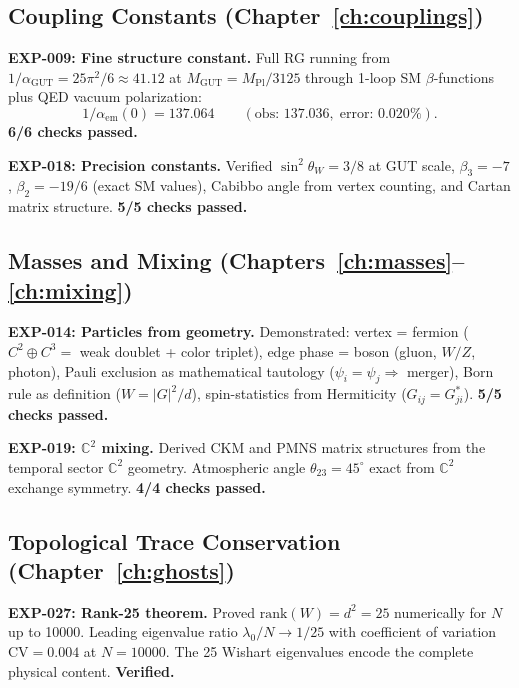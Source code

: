 \documentclass[12pt]{article}
\theoremstyle{remark}
\theoremstyle{definition}
\begin{document}
\subsection{Coupling Constants (Chapter~\ref{ch:couplings})}

\textbf{EXP-009: Fine structure constant.} Full RG running from $1/\alpha_\text{GUT} = 25\pi^2/6 \approx 41.12$ at $M_\text{GUT} = M_\text{Pl}/3125$ through 1-loop SM $\beta$-functions plus QED vacuum polarization:
\begin{equation}
1/\alpha_\text{em}(0) = 137.064 \qquad (\text{obs: } 137.036,\;\text{error: } 0.020\%).
\end{equation}
\textbf{6/6 checks passed.}

\textbf{EXP-018: Precision constants.} Verified $\sin^2\theta_W = 3/8$ at GUT scale, $\beta_3 = -7$, $\beta_2 = -19/6$ (exact SM values), Cabibbo angle from vertex counting, and Cartan matrix structure. \textbf{5/5 checks passed.}

\subsection{Masses and Mixing (Chapters~\ref{ch:masses}--\ref{ch:mixing})}

\textbf{EXP-014: Particles from geometry.} Demonstrated: vertex = fermion ($C^2 \oplus C^3 =$ weak doublet + color triplet), edge phase = boson (gluon, $W/Z$, photon), Pauli exclusion as mathematical tautology ($\psi_i = \psi_j \Rightarrow$ merger), Born rule as definition ($W = |G|^2/d$), spin-statistics from Hermiticity ($G_{ij} = G_{ji}^*$). \textbf{5/5 checks passed.}

\textbf{EXP-019: $\mathbb{C}^2$ mixing.} Derived CKM and PMNS matrix structures from the temporal sector $\mathbb{C}^2$ geometry. Atmospheric angle $\theta_{23} = 45^\circ$ exact from $\mathbb{C}^2$ exchange symmetry. \textbf{4/4 checks passed.}

\subsection{Topological Trace Conservation (Chapter~\ref{ch:ghosts})}

\textbf{EXP-027: Rank-25 theorem.} Proved $\text{rank}(W) = d^2 = 25$ numerically for $N$ up to 10000. Leading eigenvalue ratio $\lambda_0/N \to 1/25$ with coefficient of variation $\text{CV} = 0.004$ at $N = 10000$. The 25 Wishart eigenvalues encode the complete physical content. \textbf{Verified.}
\end{document}
